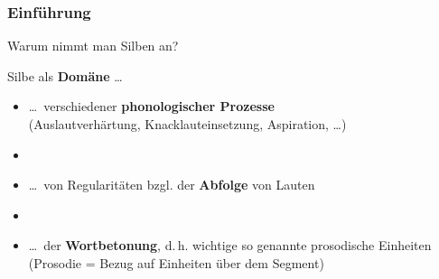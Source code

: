 \begin{frame}
\frametitle{Einführung}

Warum nimmt man Silben an?

Silbe als \textbf{Domäne} \dots

\begin{itemize}	
	\item \dots\ verschiedener \textbf{phonologischer Prozesse}\\
               (\zB Auslautverhärtung, Knacklauteinsetzung, Aspiration, \dots )
	
	\item[] 
	
	\item \dots\ von Regularitäten bzgl. der \textbf{Abfolge} von Lauten
	
	\item[]
	
	\item \dots\ der \textbf{Wortbetonung}, d.\,h. wichtige so genannte prosodische Einheiten (Prosodie = Bezug auf Einheiten über dem Segment)
\end{itemize}

\end{frame}





